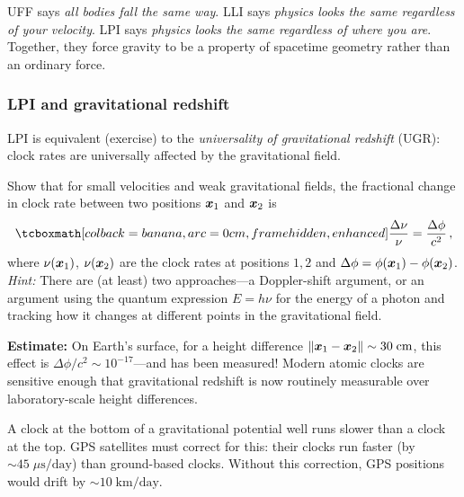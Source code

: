 \begin{intuition}
  UFF says \emph{all bodies fall the same way}.
  LLI says \emph{physics looks the same regardless of your velocity}.
  LPI says \emph{physics looks the same regardless of where you are}.
  Together, they force gravity to be a property of spacetime
  geometry rather than an ordinary force.
\end{intuition}

\subsubsection{LPI and gravitational redshift}

LPI is equivalent (exercise) to the \emph{universality of gravitational
redshift} (UGR): clock rates are universally affected by the
gravitational field.

\begin{exercise}\label{ex:grav-redshift}
  Show that for small velocities and weak gravitational fields,
  the fractional change in clock rate between two positions
  $\boldsymbol{x}_1$ and $\boldsymbol{x}_2$ is
  \begin{equation}\label{eq:grav-redshift}
    \eqbox{\frac{\Delta\nu}{\nu}
      = \frac{\Delta\phi}{c^2}}\,,
  \end{equation}
  where $\nu(\boldsymbol{x}_1)$, $\nu(\boldsymbol{x}_2)$ are the clock rates at
  positions $1,2$ and
  $\Delta\phi = \phi(\boldsymbol{x}_1) - \phi(\boldsymbol{x}_2)$.
  \emph{Hint:} There are (at least) two approaches---a Doppler-shift
  argument, or an argument using the quantum expression $E = h\nu$ for
  the energy of a photon and tracking how it changes at different
  points in the gravitational field.
\end{exercise}

\noindent\textbf{Estimate:} On Earth's surface, for a height difference
$\lVert \boldsymbol{x}_1 - \boldsymbol{x}_2 \rVert \sim 30\;\mathrm{cm}$, this effect is
$\Delta\phi/c^2 \sim 10^{-17}$---and has been measured!  Modern atomic
clocks are sensitive enough that gravitational redshift is now
routinely measurable over laboratory-scale height differences.

\begin{intuition}
  A clock at the bottom of a gravitational potential well runs slower
  than a clock at the top.  GPS satellites must correct for this:
  their clocks run faster (by $\sim 45\;\mu\mathrm{s}/\mathrm{day}$)
  than ground-based clocks.  Without this correction, GPS positions
  would drift by $\sim 10\;\mathrm{km}/\mathrm{day}$.
\end{intuition}


